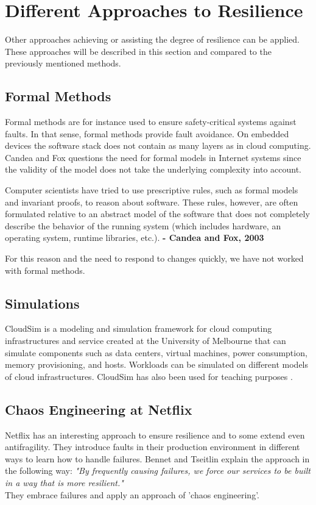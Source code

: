 \section{Different Approaches to Resilience}\label{resilience_approaches}
Other approaches achieving or assisting the degree of resilience can be applied. These approaches will be described in this section and compared to the previously mentioned methods.

\subsection*{Formal Methods}
Formal methods are for instance used to ensure safety-critical systems against faults. In that sense, formal methods provide fault avoidance. On embedded devices the software stack does not contain as many layers as in cloud computing. Candea and Fox questions the need for formal models in Internet systems since the validity of the model does not take the underlying complexity into account.

\begin{citat} []
Computer scientists have tried to use prescriptive rules, such as formal models and invariant proofs, to reason about software. These rules, however, are often formulated relative to an abstract model of the software that does not completely describe the behavior of the running system (which includes hardware, an operating system, runtime libraries, etc.). \textbf{- Candea and Fox, 2003} \cite[p. 68]{candea2003crashonly}
\end{citat}

\noindent 
For this reason and the need to respond to changes quickly, we have not worked with formal methods.


\subsection*{Simulations}
CloudSim is a modeling and simulation framework for cloud computing infrastructures and service created at the University of Melbourne that can simulate components such as data centers, virtual machines, power consumption, memory provisioning, and hosts. Workloads can be simulated on different models of cloud infrastructures. CloudSim has also been used for teaching purposes \cite{jararweh2013teachcloud}. 

\subsection*{Chaos Engineering at Netflix}
\noindent 
Netflix has an interesting approach to ensure resilience and to some extend even antifragility. They introduce faults in their production environment in different ways to learn how to handle failures.
Bennet and Tseitlin explain the approach in the following way:
 \textit{"By frequently causing failures, we force our services to be built in a way that is more resilient." \cite{bennett2012chaosmonkey}} \\ 
They embrace failures and apply an approach of 'chaos engineering'. \\

